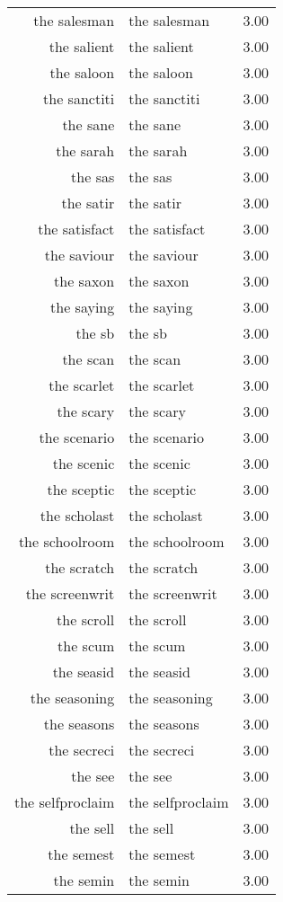 \begin{table}[ht]
\begin{tabular}{rlr}
  the salesman & the salesman & 3.00 \\ 
  the salient & the salient & 3.00 \\ 
  the saloon & the saloon & 3.00 \\ 
  the sanctiti & the sanctiti & 3.00 \\ 
  the sane & the sane & 3.00 \\ 
  the sarah & the sarah & 3.00 \\ 
  the sas & the sas & 3.00 \\ 
  the satir & the satir & 3.00 \\ 
  the satisfact & the satisfact & 3.00 \\ 
  the saviour & the saviour & 3.00 \\ 
  the saxon & the saxon & 3.00 \\ 
  the saying & the saying & 3.00 \\ 
  the sb & the sb & 3.00 \\ 
  the scan & the scan & 3.00 \\ 
  the scarlet & the scarlet & 3.00 \\ 
  the scary & the scary & 3.00 \\ 
  the scenario & the scenario & 3.00 \\ 
  the scenic & the scenic & 3.00 \\ 
  the sceptic & the sceptic & 3.00 \\ 
  the scholast & the scholast & 3.00 \\ 
  the schoolroom & the schoolroom & 3.00 \\ 
  the scratch & the scratch & 3.00 \\ 
  the screenwrit & the screenwrit & 3.00 \\ 
  the scroll & the scroll & 3.00 \\ 
  the scum & the scum & 3.00 \\ 
  the seasid & the seasid & 3.00 \\ 
  the seasoning & the seasoning & 3.00 \\ 
  the seasons & the seasons & 3.00 \\ 
  the secreci & the secreci & 3.00 \\ 
  the see & the see & 3.00 \\ 
  the selfproclaim & the selfproclaim & 3.00 \\ 
  the sell & the sell & 3.00 \\ 
  the semest & the semest & 3.00 \\ 
  the semin & the semin & 3.00 \\ 

\end{tabular}
\end{table}

